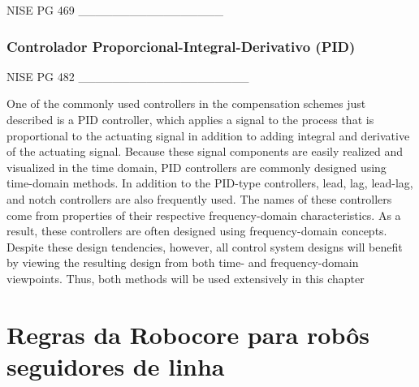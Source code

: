 NISE PG 469
_________________

\subsubsection{Controlador Proporcional-Integral-Derivativo (PID)}

NISE PG 482
____________________

One of the commonly used controllers in the compensation schemes just described is a
PID controller, which applies a signal to the process that is proportional to the actuating
signal in addition to adding integral and derivative of the actuating signal. Because these
signal components are easily realized and visualized in the time domain, PID controllers
are commonly designed using time-domain methods. In addition to the PID-type controllers, lead, lag, lead-lag, and notch controllers are also frequently used. The names of these
controllers come from properties of their respective frequency-domain characteristics. As a
result, these controllers are often designed using frequency-domain concepts. Despite these
design tendencies, however, all control system designs will benefit by viewing the resulting
design from both time- and frequency-domain viewpoints. Thus, both methods will be used
extensively in this chapter

\vspace{1cm}
\section{Regras da Robocore para robôs seguidores de linha} \label{cap:regras_comp}


